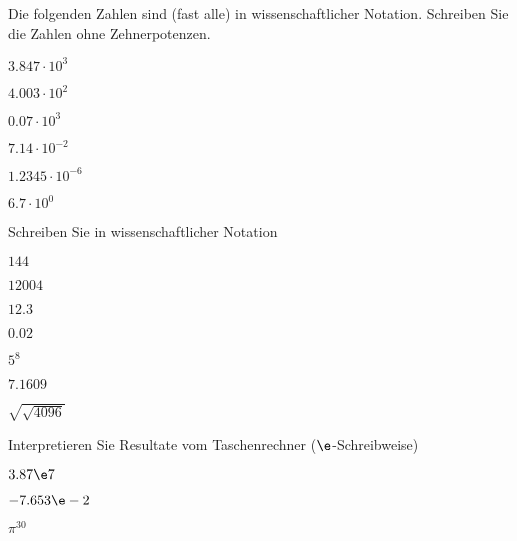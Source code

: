 \platzFuerBerechnungenBisEndeSeite{}
\TRAINER{\newpage}

Die folgenden Zahlen sind (fast alle) in wissenschaftlicher Notation. Schreiben
Sie die Zahlen ohne Zehnerpotenzen.

\begin{bbwAufgabenBlock}
\item $3.847 \cdot{} 10^3$ 
\item $4.003\cdot{} 10^2$ 
\item $0.07\cdot{}10^3$ 
\item $7.14\cdot{}10^{-2}$
\item $1.2345\cdot{}10^{-6}$ 
\item $6.7\cdot{}10^0$ 
\end{bbwAufgabenBlock}

\platzFuerBerechnungenBisEndeSeite{}


Schreiben Sie in wissenschaftlicher Notation

\begin{bbwAufgabenBlock}
\item $144$ 
\item $12004$ 
\item $12.3$ 
\item $0.02$ 
\item $5^8$ 
\item $7.1609$ 
\item $\sqrt{\sqrt{4096}}$ 
\end{bbwAufgabenBlock}

\platzFuerBerechnungenBisEndeSeite{}

Interpretieren Sie Resultate vom Taschenrechner ($\e$-Schreibweise)

\begin{bbwAufgabenBlock}
\item $3.87\e7$ 
\item $-7.653\e-2$ 
\item $\pi^{30}$ 
\end{bbwAufgabenBlock}



